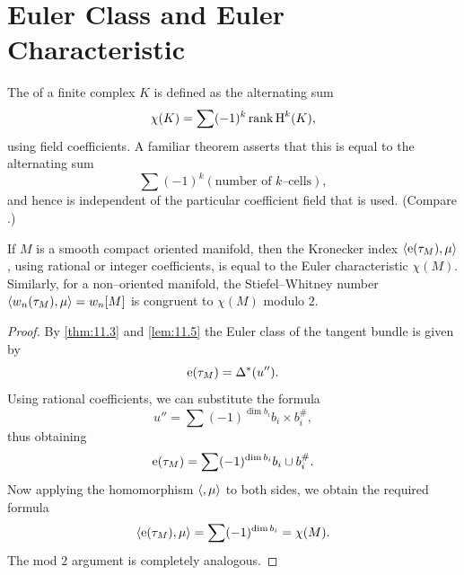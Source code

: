 \documentclass[../main]{subfiles}
\begin{document}
\section{Euler Class and Euler Characteristic}\label{sec:11.5}
The  of a finite complex $K$ is defined as the alternating sum \[\chi(K) = \sum (-1)^k \operatorname{rank} \operatorname{H}^k(K),\] using field coefficients. A familiar theorem asserts that this is equal to the alternating sum \[\sum (-1)^k (\text{number of } k\text{--cells}),\] and hence is independent of the particular coefficient field that is used. (Compare \cite[pp. 105,156]{dold1972}.)

\begin{corollary}\label{cor:11.12}
If $M$ is a smooth compact oriented manifold, then the Kronecker index $\langle\operatorname{e}(\tau_{M}),\mu\rangle$, using rational or integer coefficients, is equal to the Euler characteristic $\chi(M)$. Similarly, for a non--oriented manifold, the Stiefel--Whitney number $\langle w_n(\tau_{M}),\mu\rangle = w_n[M]$ is congruent to $\chi(M)$ modulo $2$. 
\end{corollary}

\begin{proof}
By \ref{thm:11.3} and \ref{lem:11.5} the Euler class of the tangent bundle is given by \[\operatorname{e}(\tau_{M}) = \Delta^\ast (u'').\] Using rational coefficients, we can substitute the formula \[u'' = \sum (-1)^{\dim b_i} b_i \times b_i^\#,\] thus obtaining \[\operatorname{e}(\tau_{M}) = \sum (-1)^{\dim b_i} b_i \cup b_i^\#.\] Now applying the homomorphism $\langle,\mu\rangle$ to both sides, we obtain the required formula \[\langle\operatorname{e}(\tau_{M}),\mu\rangle = \sum (-1)^{\dim b_i} = \chi(M).\] The mod $2$ argument is completely analogous.
\end{proof}
\end{document}

